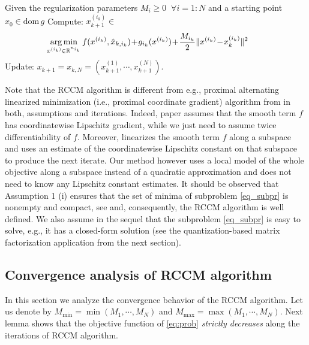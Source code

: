 \documentclass[lettersize,journal]{IEEEtran}
\DeclareMathOperator*{\argmin}{arg\,min}
\begin{document}
\begin{algorithm}
\caption{RCCM} \label{alg:RCPG}
		\begin{algorithmic} 	
			 \STATE Given the regularization parameters $M_i\geq 0 \;\;  \forall i=1:N$ and a starting point  $x_{0} \in \text{dom}\,g$
				     \STATE Compute: $x_{k+1}^{(i_{k})} \in$
                     \begin{align}  \label{eq_subpr}
                      \hspace{-0.7cm}\argmin_{x^{(i_k)} \in \mathbb{R}^{n_{i_k}} }  f(x^{(i_k)},  \hat x_{k, i_k}) \!+\!  g_{i_k} (x^{(i_k)})\!+\! \frac{M_{i_k}}{2} \|x^{(i_k)}\! -\! x_k^{(i_k)}\|^2  
                     \end{align}
             \vspace{-0.5cm}        
			\ENDFOR
            \STATE Update: $x_{k+1} = x_{k,N} = \left(x_{k+1}^{(1)},\cdots,x_{k+1}^{(N)}\right)$.
			\ENDFOR
		\end{algorithmic} 
	\end{algorithm}

\noindent Note that the RCCM algorithm  is different from e.g., proximal alternating  linearized minimization (i.e., proximal coordinate gradient) algorithm  from \cite{Teb:14} in both, assumptions and iterations. Indeed, paper \cite{Teb:14} assumes that the smooth term $f$ has coordinatewise Lipschitz gradient, while we just need to assume twice differentiability of $f$. Moreover, \cite{Teb:14} linearizes the smooth term $f$ along a subspace and uses an estimate of the coordinatewise Lipschitz constant on that subspace to produce the next iterate. Our method however  uses a local model of the whole objective along a subspace instead of a quadratic approximation and does not need to know any Lipschitz constant estimates.  It should be observed that Assumption 1 (i) ensures that the set of minima of  subproblem \eqref{eq_subpr} is nonempty and compact, see  \cite{Teb:14} and, consequently, the RCCM  algorithm is well defined.  We also assume in the sequel that the subproblem \eqref{eq_subpr} is easy to solve, e.g., it has a closed-form solution (see the quantization-based matrix factorization application from the next section).   




\subsection{Convergence analysis of RCCM algorithm}
\noindent In this section we analyze the convergence behavior of the RCCM algorithm. Let us denote by $M_{\min} = \min (M_{1},\cdots, M_N)$ and $M_{\max} = \max (M_{1},\cdots, M_N)$. Next lemma shows that the objective function of \eqref{eq:prob} \textit{strictly decreases} along the iterations of RCCM algorithm. 
\end{document}

